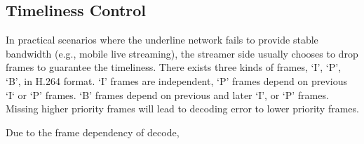 \subsection{Timeliness Control}
In practical scenarios where the underline network fails to provide stable bandwidth (e.g., mobile live streaming), the streamer side usually chooses to drop frames to guarantee the timeliness.
There exists three kinds of frames, `I', `P', `B', in H.264 format. `I' frames are independent, `P' frames depend on previous `I` or `P' frames. `B' frames depend on previous and later `I', or `P' frames. Missing higher priority frames will lead to decoding error to lower priority frames.

Due to the frame dependency of decode,
\fi
